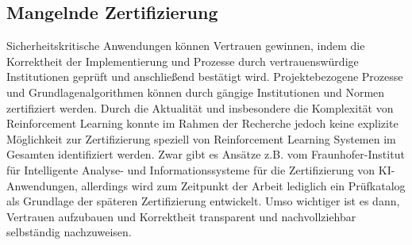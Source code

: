 \subsection{Mangelnde Zertifizierung}
Sicherheitskritische Anwendungen können Vertrauen gewinnen, indem die Korrektheit der Implementierung und Prozesse durch vertrauenswürdige Institutionen geprüft und anschließend bestätigt wird.
Projektebezogene Prozesse und Grundlagenalgorithmen können durch gängige Institutionen und Normen zertifiziert werden.
Durch die Aktualität und insbesondere die Komplexität von Reinforcement Learning konnte im Rahmen der Recherche jedoch keine explizite Möglichkeit zur Zertifizierung speziell von Reinforcement Learning Systemen im Gesamten identifiziert werden.
Zwar gibt es Ansätze z.B. vom Fraunhofer-Institut für Intelligente Analyse- und Informationssysteme \cite{cremers} für die Zertifizierung von KI-Anwendungen, allerdings wird zum Zeitpunkt der Arbeit lediglich ein Prüfkatalog als Grundlage der späteren Zertifizierung entwickelt.
Umso wichtiger ist es dann, Vertrauen aufzubauen und Korrektheit transparent und nachvollziehbar selbständig nachzuweisen.

